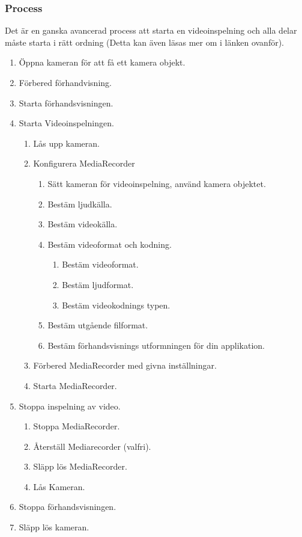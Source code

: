 \subsubsection{Process}
Det är en ganska avancerad process att starta en videoinspelning och alla delar måste starta i rätt ordning (Detta kan även läsas mer om i länken ovanför).
\begin{enumerate}
\item Öppna kameran för att få ett kamera objekt.
\item Förbered förhandvisning.
\item Starta förhandsvisningen.
\item Starta Videoinspelningen.
	\begin{enumerate}
		\item Lås upp kameran.
		\item Konfigurera MediaRecorder
		\begin{enumerate}
			\item Sätt kameran för videoinspelning, använd kamera objektet.
			\item Bestäm ljudkälla.
			\item Bestäm videokälla.
			\item Bestäm videoformat och kodning.
			\begin{enumerate}
				\item Bestäm videoformat.
				\item Bestäm ljudformat.
				\item Bestäm videokodnings typen.
			\end{enumerate}
			\item Bestäm utgående filformat.
			\item Bestäm förhandsvisnings utformningen för din applikation.
		\end{enumerate}
		\item Förbered MediaRecorder med givna inställningar.
		\item Starta MediaRecorder.
	\end{enumerate}
	\item Stoppa inspelning av video.
	\begin{enumerate}
		\item Stoppa MediaRecorder.
		\item Återställ Mediarecorder (valfri).
		\item Släpp lös MediaRecorder.
		\item Lås Kameran.
	\end{enumerate}
	\item Stoppa förhandsvisningen.
	\item Släpp lös kameran.
\end{enumerate}
